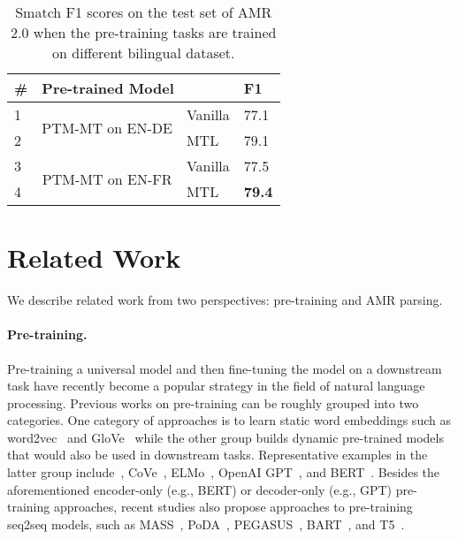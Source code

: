 \documentclass[11pt,a4paper]{article}
\begin{document}
\begin{table}[]
\centering
\small
\begin{tabular}{l|l|l|l}
\hline
\textbf{\#} & \multicolumn{2}{l|}{\textbf{Pre-trained Model}} & \textbf{F1}   \\ 
\hline
1 & \multirow{2}{*}{PTM-MT on EN-DE} & Vanilla & 77.1 \\
2 &  & MTL & 79.1 \\ 
\hline 
3 & \multicolumn{1}{c|}{\multirow{2}{*}{PTM-MT on EN-FR}} & Vanilla & 77.5 \\
4 & \multicolumn{1}{c|}{} & MTL & \textbf{79.4} \\
\hline
\end{tabular}
\caption{Smatch F1 scores on the test set of AMR 2.0 when the pre-training tasks are trained on different bilingual dataset.}
\label{tbl:change_nmt_dataset}
\end{table}


\section{Related Work}
\label{sect:related_work}
We describe related work from two perspectives: pre-training and AMR parsing. 

\paragraph{Pre-training.} Pre-training a universal model and then fine-tuning the model on a downstream task have recently become a popular strategy in the field of natural language processing. Previous works on pre-training can be roughly grouped into two categories. One category of approaches is to learn static word embeddings such as word2vec~\cite{mikolov_etal_nips_2013} and GloVe~\cite{pennington_etal_emnlp_2014} while the other group builds dynamic pre-trained models that would also be used in downstream tasks. Representative examples in the latter group include~\citet{dai_le_nips_2015}, CoVe~\cite{mccann_etal_nips_2017}, ELMo~\cite{peter_etal_naacl_2017,edunov_etal_naacl_2019}, OpenAI GPT~\cite{radford_etal_note_2018}, and BERT~\cite{devlin_etal_naacl_2019}. Besides the aforementioned encoder-only (e.g., BERT) or decoder-only (e.g., GPT) pre-training approaches, recent studies also propose approaches to pre-training seq2seq models, such as MASS~\cite{song_etal_icml_2019}, PoDA~\cite{wang_etal_emnlp_2019}, PEGASUS~\cite{zhang_etal_icml_2020}, BART~\cite{lewis_etal_acl_2020}, and T5~\cite{raffel_etal_jml_2020}. 
\end{document}
